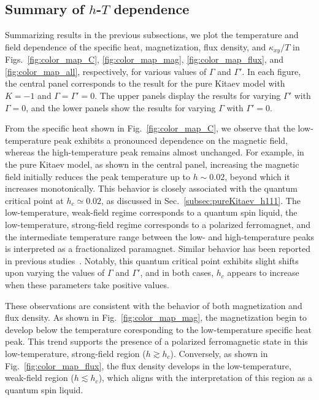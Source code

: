 \documentclass[twocolumn,superscriptaddress,showpacs, longbibliography, aps, prx]{revtex4-2}
\begin{document}
\subsection{Summary of $h$-$T$ dependence}
\label{sec:summary_of_temp_field}
Summarizing results in the previous subsections, we plot the temperature and field dependence of the specific heat, magnetization, flux density, and $\kappa_{xy}/T$ in Figs.~\ref{fig:color_map_C}, \ref{fig:color_map_mag}, \ref{fig:color_map_flux}, and \ref{fig:color_map_all}, respectively, for various values of $\Gamma$ and $\Gamma'$. 
In each figure, the central panel corresponds to the result for the pure Kitaev model with $K=-1$ and $\Gamma=\Gamma'=0$. 
The upper panels display the results for varying $\Gamma'$ with $\Gamma=0$, and the lower panels show the results for varying $\Gamma$ with $\Gamma'=0$. 

From the specific heat shown in Fig.~\ref{fig:color_map_C}, we observe that the low-temperature peak exhibits a pronounced dependence on the magnetic field, whereas the high-temperature peak remains almost unchanged. For example, in the pure Kitaev model, as shown in the central panel, increasing the magnetic field initially reduces the peak temperature up to $h \sim 0.02$, beyond which it increases monotonically. This behavior is closely associated with the quantum critical point at $h_c \simeq 0.02$, as discussed in Sec.~\ref{subsec:pureKitaev_h111}. 
The low-temperature, weak-field regime corresponds to a quantum spin liquid, the low-temperature, strong-field regime corresponds to a polarized ferromagnet, and the intermediate temperature range between the low- and high-temperature peaks is interpreted as a fractionalized paramagnet. Similar behavior has been reported in previous studies~\cite{YoshitakeNKM2020,Li2020,LiLXGQLS2024}.
Notably, this quantum critical point exhibits slight shifts upon varying the values of $\Gamma$ and $\Gamma'$, and in both cases, $h_c$ appears to increase when these parameters take positive values. 

These observations are consistent with the behavior of both magnetization and flux density. 
As shown in Fig.~\ref{fig:color_map_mag}, the magnetization begin to develop below the temperature coresponding to the low-temperature specific heat peak. 
This trend supports the presence of a polarized ferromagnetic state in this low-temperature, strong-field region ($h \gtrsim h_c$). 
Conversely, as shown in Fig.~\ref{fig:color_map_flux}, the flux density develops in the low-temperature, 
weak-field region ($h \lesssim h_c$), which aligns with the interpretation of this region as a quantum spin liquid.
\end{document}
